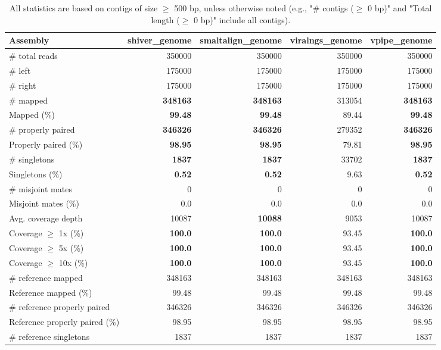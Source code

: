 \documentclass[12pt,a4paper]{article}
\begin{document}
\begin{table}[ht]
\begin{center}
\caption{All statistics are based on contigs of size $\geq$ 500 bp, unless otherwise noted (e.g., "\# contigs ($\geq$ 0 bp)" and "Total length ($\geq$ 0 bp)" include all contigs).}
\begin{tabular}{|l*{4}{|r}|}
\hline
Assembly & shiver\_genome & smaltalign\_genome & viralngs\_genome & vpipe\_genome \\ \hline
\# total reads & 350000 & 350000 & 350000 & 350000 \\ \hline
\# left & 175000 & 175000 & 175000 & 175000 \\ \hline
\# right & 175000 & 175000 & 175000 & 175000 \\ \hline
\# mapped & {\bf 348163} & {\bf 348163} & 313054 & {\bf 348163} \\ \hline
Mapped (\%) & {\bf 99.48} & {\bf 99.48} & 89.44 & {\bf 99.48} \\ \hline
\# properly paired & {\bf 346326} & {\bf 346326} & 279352 & {\bf 346326} \\ \hline
Properly paired (\%) & {\bf 98.95} & {\bf 98.95} & 79.81 & {\bf 98.95} \\ \hline
\# singletons & {\bf 1837} & {\bf 1837} & 33702 & {\bf 1837} \\ \hline
Singletons (\%) & {\bf 0.52} & {\bf 0.52} & 9.63 & {\bf 0.52} \\ \hline
\# misjoint mates & 0 & 0 & 0 & 0 \\ \hline
Misjoint mates (\%) & 0.0 & 0.0 & 0.0 & 0.0 \\ \hline
Avg. coverage depth & 10087 & {\bf 10088} & 9053 & 10087 \\ \hline
Coverage $\geq$ 1x (\%) & {\bf 100.0} & {\bf 100.0} & 93.45 & {\bf 100.0} \\ \hline
Coverage $\geq$ 5x (\%) & {\bf 100.0} & {\bf 100.0} & 93.45 & {\bf 100.0} \\ \hline
Coverage $\geq$ 10x (\%) & {\bf 100.0} & {\bf 100.0} & 93.45 & {\bf 100.0} \\ \hline
\# reference mapped & 348163 & 348163 & 348163 & 348163 \\ \hline
Reference mapped (\%) & 99.48 & 99.48 & 99.48 & 99.48 \\ \hline
\# reference properly paired & 346326 & 346326 & 346326 & 346326 \\ \hline
Reference properly paired (\%) & 98.95 & 98.95 & 98.95 & 98.95 \\ \hline
\# reference singletons & 1837 & 1837 & 1837 & 1837 \\ \hline

\end{tabular}
\end{center}
\end{table}
\end{document}
